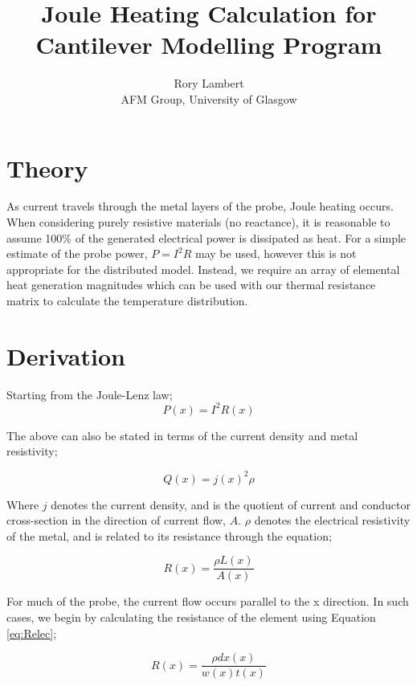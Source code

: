\documentclass[]{report}
\title{Joule Heating Calculation for Cantilever Modelling Program}
\author{Rory Lambert\\ AFM Group, University of Glasgow}
\begin{document}
\maketitle

\section{Theory}

As current travels through the metal layers of the probe, Joule heating occurs. When considering purely resistive materials (no reactance), it is reasonable to assume 100\%  of the generated electrical power is dissipated as heat. For a simple estimate of the probe power, $P=I^2R$ may be used, however this is not appropriate for the distributed model. Instead, we require an array of elemental heat generation magnitudes which can be used with our thermal resistance matrix to calculate the temperature distribution.


\section{Derivation}

Starting from the Joule-Lenz law;
\begin{equation}\label{eq:joule}
P(x)=I^2R(x)
\end{equation}

The above can also be stated in terms of the current density and metal resistivity;

\begin{equation}
Q(x)=j(x)^2\rho
\end{equation}

Where $j$ denotes the current density, and is the quotient of current and conductor cross-section in the direction of current flow, $A$. $\rho$ denotes the electrical resistivity of the metal, and is related to its resistance through the equation;

\begin{equation}\label{eq:Relec}
R(x)=\frac{\rho L(x)}{A(x)}
\end{equation}

For much of the probe, the current flow occurs parallel to the x direction. In such cases, we begin by calculating the resistance of the element using Equation \ref{eq:Relec};

\begin{equation}\label{eq:Relec_dist}
R(x)=\frac{\rho dx(x)}{w(x)t(x)}
\end{equation}
\end{document}
